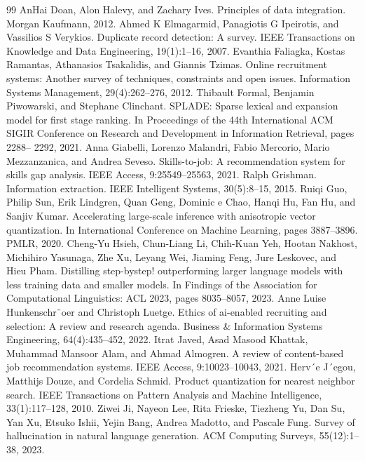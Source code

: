 \begin{thebibliography}{99}
 AnHai Doan, Alon Halevy, and Zachary Ives. Principles of data integration. Morgan Kaufmann, 2012.
 Ahmed K Elmagarmid, Panagiotis G Ipeirotis, and Vassilios S Verykios. Duplicate record detection: A survey. IEEE Transactions on Knowledge and Data Engineering, 19(1):1--16, 2007.
 Evanthia Faliagka, Kostas Ramantas, Athanasios Tsakalidis, and Giannis Tzimas. Online recruitment systems: Another survey of techniques, constraints and open issues. Information Systems Management, 29(4):262--276, 2012.
 Thibault Formal, Benjamin Piwowarski, and Stephane Clinchant. SPLADE: Sparse lexical and expansion model for first stage ranking. In Proceedings of the 44th International ACM SIGIR Conference on Research and Development in Information Retrieval, pages 2288-- 2292, 2021.
 Anna Giabelli, Lorenzo Malandri, Fabio Mercorio, Mario Mezzanzanica, and Andrea Seveso. Skills-to-job: A recommendation system for skills gap analysis. IEEE Access, 9:25549--25563, 2021.
 Ralph Grishman. Information extraction. IEEE Intelligent Systems, 30(5):8--15, 2015.
 Ruiqi Guo, Philip Sun, Erik Lindgren, Quan Geng, Dominic e Chao, Hanqi Hu, Fan Hu, and Sanjiv Kumar. Accelerating large-scale inference with anisotropic vector quantization. In International Conference on Machine Learning, pages 3887--3896. PMLR, 2020.
 Cheng-Yu Hsieh, Chun-Liang Li, Chih-Kuan Yeh, Hootan Nakhost, Michihiro Yasunaga, Zhe Xu, Leyang Wei, Jiaming Feng, Jure Leskovec, and Hieu Pham. Distilling step-bystep! outperforming larger language models with less training data and smaller models. In Findings of the Association for Computational Linguistics: ACL 2023, pages 8035--8057, 2023.
 Anne Luise Hunkenschr¨oer and Christoph Luetge. Ethics of ai-enabled recruiting and selection: A review and research agenda. Business \& Information Systems Engineering, 64(4):435--452, 2022.
 Itrat Javed, Asad Masood Khattak, Muhammad Mansoor Alam, and Ahmad Almogren. A review of content-based job recommendation systems. IEEE Access, 9:10023--10043, 2021.
 Herv´e J´egou, Matthijs Douze, and Cordelia Schmid. Product quantization for nearest neighbor search. IEEE Transactions on Pattern Analysis and Machine Intelligence, 33(1):117--128, 2010.
 Ziwei Ji, Nayeon Lee, Rita Frieske, Tiezheng Yu, Dan Su, Yan Xu, Etsuko Ishii, Yejin Bang, Andrea Madotto, and Pascale Fung. Survey of hallucination in natural language generation. ACM Computing Surveys, 55(12):1--38, 2023.

\end{thebibliography}

